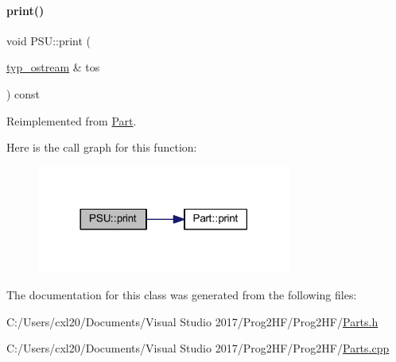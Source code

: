 \paragraph{\texorpdfstring{print()}{print()}\hspace{0.1cm}{\footnotesize\ttfamily [4/4]}}
{\footnotesize\ttfamily void P\+S\+U\+::print (\begin{DoxyParamCaption}\item[{\mbox{\hyperlink{structtyp__ostream}{typ\+\_\+ostream}} \&}]{tos }\end{DoxyParamCaption}) const\hspace{0.3cm}{\ttfamily [virtual]}}



Reimplemented from \mbox{\hyperlink{class_part_ab6396030e8b7a724731a8b54bd4942fc}{Part}}.

Here is the call graph for this function\+:
\nopagebreak
\begin{figure}[H]
\begin{center}
\leavevmode
\includegraphics[width=237pt]{class_p_s_u_a3690cd51ec36d4a1417c22612793e01c_cgraph}
\end{center}
\end{figure}


The documentation for this class was generated from the following files\+:\begin{DoxyCompactItemize}
\item 
C\+:/\+Users/cxl20/\+Documents/\+Visual Studio 2017/\+Prog2\+H\+F/\+Prog2\+H\+F/\mbox{\hyperlink{_parts_8h}{Parts.\+h}}\item 
C\+:/\+Users/cxl20/\+Documents/\+Visual Studio 2017/\+Prog2\+H\+F/\+Prog2\+H\+F/\mbox{\hyperlink{_parts_8cpp}{Parts.\+cpp}}\end{DoxyCompactItemize}
